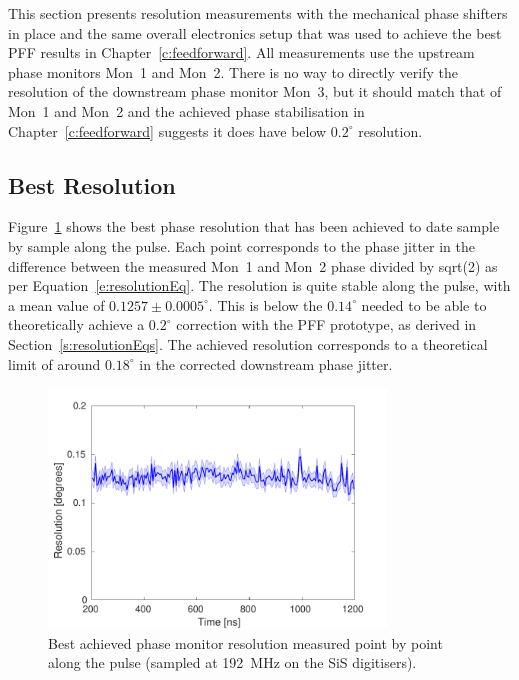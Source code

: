 
This section presents resolution measurements with the mechanical phase shifters in place and the same overall electronics setup that was used to achieve the best PFF results in Chapter~\ref{c:feedforward}. All measurements use the upstream phase monitors Mon~1 and Mon~2. There is no way to directly verify the resolution of the downstream phase monitor Mon~3, but it should match that of Mon~1 and Mon~2 and the achieved phase stabilisation in Chapter~\ref{c:feedforward} suggests it does have below \(0.2^\circ\) resolution.

\subsection{Best Resolution}
\label{ss:bestRes}

Figure~\ref{f:bestResolution} shows the best phase resolution that has been achieved to date sample by sample along the pulse. Each point corresponds to the phase jitter in the difference between the measured Mon~1 and Mon~2 phase divided by sqrt(2) as per Equation~\ref{e:resolutionEq}.  The resolution is quite stable along the pulse, with a mean value of \(0.1257\pm0.0005^\circ\). This is below the \(0.14^\circ\) needed to be able to theoretically achieve a \(0.2^\circ\) correction with the PFF prototype, as derived in Section~\ref{s:resolutionEqs}. The achieved resolution corresponds to a theoretical limit of around \(0.18^\circ\) in the corrected downstream phase jitter.

\begin{figure}
  \centering
  \includegraphics[width=0.8\textwidth]{Figures/phaseMons/bestResolution}
  \caption{Best achieved phase monitor resolution measured point by point along the pulse (sampled at 192~MHz on the SiS digitisers).}
  \label{f:bestResolution}
\end{figure}

